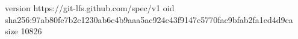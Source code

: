 version https://git-lfs.github.com/spec/v1
oid sha256:97ab80fe7b2c1230ab6c4b9aaa5ac924c43f9147c5770fac9bfab2fa1ed4d9ca
size 10826
